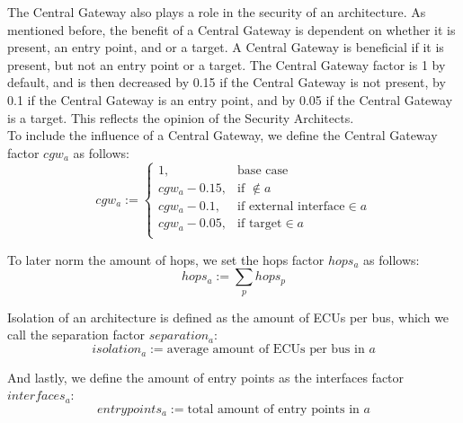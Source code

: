 \hfill \break

The Central Gateway also plays a role in the security of an architecture.
As mentioned before, the benefit of a Central Gateway is dependent on whether it is present, an entry point, and or a target.
A Central Gateway is beneficial if it is present, but not an entry point or a target.
The Central Gateway factor is 1 by default, and is then decreased by 0.15 if the Central Gateway is not present,
by 0.1 if the Central Gateway is an entry point, and by 0.05 if the Central Gateway is a target.
This reflects the opinion of the Security Architects.\\
To include the influence of a Central Gateway, we define the Central Gateway factor $cgw_{a}$ as follows:\\
\begin{equation}
    cgw_{a} := 
    \begin{cases}
    1,&\text{base case}\\
    cgw_{a} - 0.15,&\text{if } \not\in a\\
    cgw_{a} - 0.1,&\text{if external interface} \in a\\
    cgw_{a} - 0.05,&\text{if target} \in a\\
    \end{cases} \label{eq:cgw}
\end{equation}

\hfill \break

To later norm the amount of hops, we set the hops factor $hops_{a}$ as follows:\\
\begin{equation}
    hops_{a} := \sum_{p} hops_{p} \label{eq:hops}
\end{equation}

\hfill \break

Isolation of an architecture is defined as the amount of ECUs per bus, which we call the separation factor $separation_{a}$:\\
\begin{equation}
    isolation_{a} := \text{average amount of ECUs per bus in } a \label{eq:isolation}
\end{equation}

\hfill \break

And lastly, we define the amount of entry points as the interfaces factor $interfaces_{a}$:\\
\begin{equation}
    entrypoints_{a} := \text{total amount of entry points in } a \label{eq:interfaces}
\end{equation}


